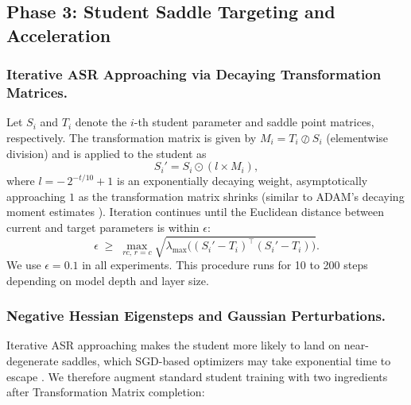 \documentclass[letterpaper]{article}
\begin{document}
\subsection{Phase 3: Student Saddle Targeting and Acceleration}

\subsubsection{Iterative ASR Approaching via Decaying Transformation Matrices.}
Let $S_i$ and $T_i$ denote the $i$-th student parameter and saddle point matrices, respectively. The transformation matrix is given by $M_i = T_i \oslash S_i$ (elementwise division) and is applied to the student as
\begin{equation}
S_i' = S_i \odot (l \times M_i),
\end{equation}
where $l = -\,2^{-t/10} + 1$ is an exponentially decaying weight, asymptotically approaching $1$ as the transformation matrix shrinks (similar to ADAM's decaying moment estimates \citep{kingma2015adam}). Iteration continues until the Euclidean distance between current and target parameters is within $\epsilon$:
\begin{equation}
\epsilon \;\ge\; \max_{rc,\, r=c} \sqrt{\lambda_{\max}\big((S_i' - T_i)^\top (S_i' - T_i)\big)}.
\end{equation}
We use $\epsilon = 0.1$ in all experiments. This procedure runs for 10 to 200 steps depending on model depth and layer size.

\subsubsection{Negative Hessian Eigensteps and Gaussian Perturbations.}
Iterative ASR approaching makes the student more likely to land on near-degenerate saddles, which SGD-based optimizers may take exponential time to escape \citep{dauphin2014identifying, jin2017escape}. We therefore augment standard student training with two ingredients after Transformation Matrix completion:
\end{document}
